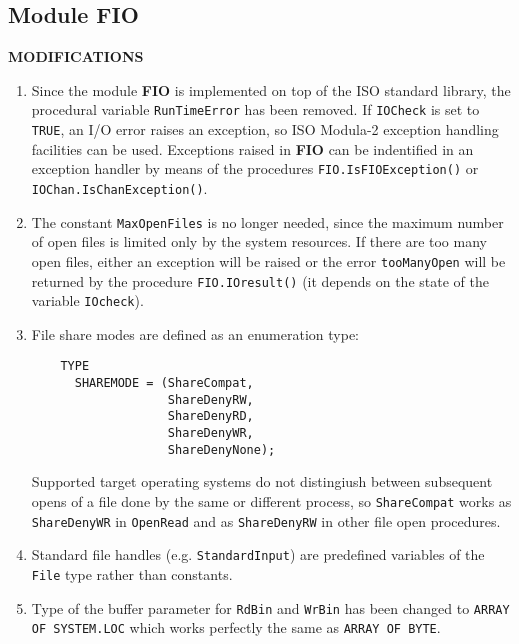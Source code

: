 \subsection{Module FIO}

{\bf MODIFICATIONS}

\begin{enumerate}

\item Since the module {\bf FIO} is implemented on top of the ISO standard library,
      the procedural variable \verb'RunTimeError' has been removed. If \verb'IOCheck'
      is set to \verb'TRUE', an I/O error raises an exception, so ISO Modula-2
      exception handling facilities can be used. Exceptions raised in {\bf FIO}
      can be indentified in an exception handler by means of the procedures
      \verb'FIO.IsFIOException()' or \verb'IOChan.IsChanException()'.

\item The constant \verb'MaxOpenFiles' is no longer needed, since the maximum number of
      open files is limited only by the system resources. If there are
      too many open files, either an exception will be raised or the error
      \verb'tooManyOpen' will be returned by the procedure \verb'FIO.IOresult()'
      (it depends on the state of the variable \verb'IOcheck').

\item File share modes are defined as an enumeration type:

\begin{verbatim}
    TYPE
      SHAREMODE = (ShareCompat,
                   ShareDenyRW,
                   ShareDenyRD,
                   ShareDenyWR,
                   ShareDenyNone);
\end{verbatim}

      Supported target operating systems do not distingiush between subsequent opens
      of a file done by the same or different process, so \verb'ShareCompat' works
      as \verb'ShareDenyWR' in \verb'OpenRead' and as \verb'ShareDenyRW' in other
      file open procedures.

\item Standard file handles (e.g. \verb'StandardInput') are predefined variables of
      the \verb'File' type rather than constants.

\item Type of the buffer parameter for \verb'RdBin' and \verb'WrBin' has been changed to
      \verb'ARRAY OF SYSTEM.LOC' which works perfectly the same as \verb'ARRAY OF BYTE'.


\end{enumerate}
